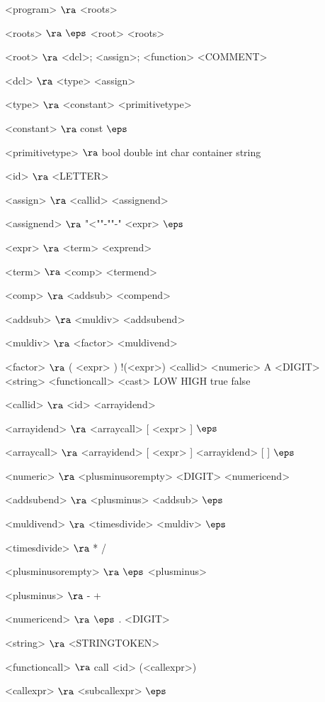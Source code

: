 \begin{grammar}
<program> $\ra$ <roots>

<roots> $\ra$ $\eps$
\alt <root> <roots>
 
<root> $\ra$ <dcl>;
\alt <assign>;
\alt <function>
\alt <COMMENT>

<dcl> $\ra$ <type> <assign>

<type> $\ra$ <constant> <primitivetype>

<constant> $\ra$ const
\alt $\eps$

<primitivetype> $\ra$ bool
\alt double
\alt int
\alt char
\alt container
\alt string

<id> $\ra$ <LETTER>

<assign> $\ra$ <callid> <assignend>

<assignend> $\ra$ "<""-""-" <expr>
\alt $\eps$

<expr> $\ra$ <term> <exprend>

<term> $\ra$ <comp> <termend>

<comp> $\ra$ <addsub> <compend>

<addsub> $\ra$ <muldiv> <addsubend>

<muldiv> $\ra$ <factor> <muldivend>

<factor> $\ra$ ( <expr> )
	\alt !(<expr>)
	\alt <callid>
	\alt <numeric>
	\alt A  <DIGIT>
	\alt <string>
	\alt <functioncall> 
	\alt <cast>
	\alt LOW
	\alt HIGH
	\alt true
	\alt false

<callid> $\ra$ <id> <arrayidend>

<arrayidend> $\ra$ <arraycall> [ <expr> ]
\alt $\eps$

<arraycall> $\ra$  <arrayidend> [ <expr> ]
\alt <arrayidend> [ ]
\alt $\eps$

<numeric> $\ra$ <plusminusorempty> <DIGIT> <numericend>

<addsubend> $\ra$ <plusminus> <addsub>
\alt $\eps$

<muldivend> $\ra$ <timesdivide> <muldiv>
\alt $\eps$

<timesdivide> $\ra$ *
\alt /

<plusminusorempty> $\ra$ $\eps$
\alt <plusminus>

<plusminus> $\ra$ - 
\alt +

<numericend> $\ra$ $\eps$
\alt . <DIGIT>

<string> $\ra$ <STRINGTOKEN>

<functioncall> $\ra$ call <id> (<callexpr>)

<callexpr> $\ra$ <subcallexpr>
\alt$\eps$


\end{grammar}
